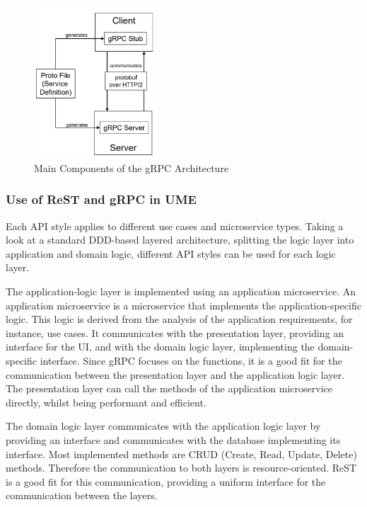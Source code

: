 \begin{figure}
    \centering
    \includegraphics[width=0.4\textwidth]{figures/microservices/microservices_grpcMainComponents.png}
    \caption{Main Components of the gRPC Architecture}
    \label{fig:grpc_main_components}
\end{figure}

\subsubsection*{Use of ReST and gRPC in UME}
Each API style applies to different use cases and microservice types.
Taking a look at a standard DDD-based layered architecture, splitting the logic layer into application and domain logic, different API styles can be used for each logic layer.

The application-logic layer is implemented using an application microservice.
An application microservice is a microservice that implements the application-specific logic.
This logic is derived from the analysis of the application requirements, for instance, use cases.
It communicates with the presentation layer, providing an interface for the UI, and with the domain logic layer, implementing the domain-specific interface.
Since gRPC focuses on the functions, it is a good fit for the communication between the presentation layer and the application logic layer.
The presentation layer can call the methods of the application microservice directly, whilst being performant and efficient.

The domain logic layer communicates with the application logic layer by providing an interface and communicates with the database implementing its interface.
Most implemented methods are CRUD (Create, Read, Update, Delete) methods.
Therefore the communication to both layers is resource-oriented.
ReST is a good fit for this communication, providing a uniform interface for the communication between the layers.

